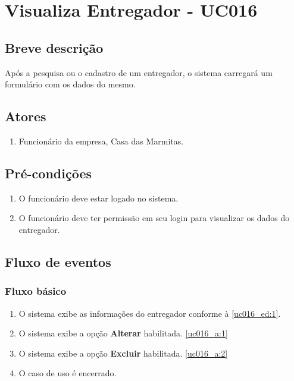 \chapter{Visualiza Entregador - UC016} \label{uc016}

\section{Breve descrição}

Após a pesquisa ou o cadastro de um entregador, o sistema carregará um formulário com os dados do mesmo.

\section{Atores}

\begin{enumerate}
	\item Funcionário da empresa, Casa das Marmitas.
\end{enumerate}

\section{Pré-condições}

\begin{enumerate}
	\item O funcionário deve estar logado no sistema.
	\item O funcionário deve ter permissão em seu login para visualizar os dados do entregador.
\end{enumerate}

\section{Fluxo de eventos}

\subsection{Fluxo básico}

\begin{enumerate}[label=P\arabic*]
	\item O sistema exibe as informações do entregador conforme à \ref{uc016_ed:1}. \label{uc016_p:1}
	\item O sistema exibe a opção \textbf{Alterar} habilitada.\label{uc016_p:2} \ref{uc016_a:1} 
	\item O sistema exibe a opção \textbf{Excluir} habilitada.\label{uc016_p:3} \ref{uc016_a:2}
	\item O caso de uso é encerrado.
\end{enumerate}

